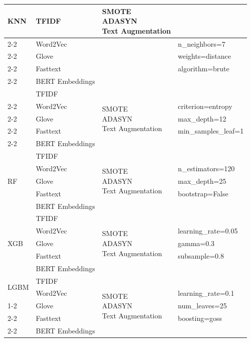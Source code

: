 \begin{center}
\begin{longtable}{|l|l|l|l|}
\multirow{5}{*}{KNN} & TFIDF & \multirow{5}{*}{\parbox{3cm}{SMOTE\\ADASYN\\Text Augmentation}} & \\ \cline{2-2}
& Word2Vec & & n\_neighbors=7 \\ \cline{2-2}
& Glove & & weights=distance \\ \cline{2-2}
& Fasttext & & algorithm=brute \\ \cline{2-2}
& BERT Embeddings & &  \\ \hline
\newpage
\multirow{5}{*}{DT} & TFIDF & \multirow{5}{*}{\parbox{3cm}{SMOTE\\ADASYN\\Text Augmentation}} & \\ \cline{2-2}
& Word2Vec & & criterion=entropy \\ \cline{2-2}
& Glove & & max\_depth=12 \\ \cline{2-2}
& Fasttext & & min\_samples\_leaf=1 \\ \cline{2-2}
& BERT Embeddings & &  \\ \hline

\multirow{5}{*}{RF} & TFIDF & \multirow{5}{*}{\parbox{3cm}{SMOTE\\ADASYN\\Text Augmentation}} & \\ \cline{2-2}
& Word2Vec & & n\_estimators=120 \\ \cline{2-2}
& Glove & & max\_depth=25 \\ \cline{2-2}
& Fasttext & & bootstrap=False \\ \cline{2-2}
& BERT Embeddings & &  \\ \hline

\multirow{5}{*}{XGB} & TFIDF & \multirow{5}{*}{\parbox{3cm}{SMOTE\\ADASYN\\Text Augmentation}} & \\ \cline{2-2}
& Word2Vec & & learning\_rate=0.05 \\ \cline{2-2}
& Glove & & gamma=0.3 \\ \cline{2-2}
& Fasttext & & subsample=0.8 \\ \cline{2-2}
& BERT Embeddings & &  \\ \hline


\multirow{2}{*}{LGBM} & TFIDF & \multirow{5}{*}{\parbox{3cm}{SMOTE\\ADASYN\\Text Augmentation}} & \\ \cline{2-2}
& Word2Vec & & learning\_rate=0.1 \\ \cline{1-2} \cline{4-4}
\multirow{3}{*}{LGBM} & Glove & & num\_leaves=25 \\ \cline{2-2} \cline{4-4}
& Fasttext & & boosting=goss \\ \cline{2-2} \cline{4-4}
& BERT Embeddings & & \\ \hline



\end{longtable}
\end{center}
